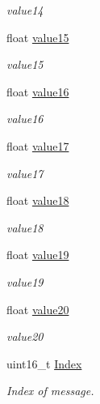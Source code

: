 \begin{DoxyCompactItemize}
\begin{DoxyCompactList}\small\item\em value14 \end{DoxyCompactList}\item 
float \hyperlink{struct____mavlink__aq__telemetry__f__t_add6707aad134b21cad79dd29be356e81}{value15}
\begin{DoxyCompactList}\small\item\em value15 \end{DoxyCompactList}\item 
float \hyperlink{struct____mavlink__aq__telemetry__f__t_a302f85b40e4095e8666e09f5cab8865c}{value16}
\begin{DoxyCompactList}\small\item\em value16 \end{DoxyCompactList}\item 
float \hyperlink{struct____mavlink__aq__telemetry__f__t_ac6b12bfc0d07d3e1c79b8f1b9692ac2d}{value17}
\begin{DoxyCompactList}\small\item\em value17 \end{DoxyCompactList}\item 
float \hyperlink{struct____mavlink__aq__telemetry__f__t_aee06c902caae1cff15844298bb830280}{value18}
\begin{DoxyCompactList}\small\item\em value18 \end{DoxyCompactList}\item 
float \hyperlink{struct____mavlink__aq__telemetry__f__t_a155ab14ba77e328a1b982118c37a1a3e}{value19}
\begin{DoxyCompactList}\small\item\em value19 \end{DoxyCompactList}\item 
float \hyperlink{struct____mavlink__aq__telemetry__f__t_acd544012d0c8d664d035d7a8e97332fd}{value20}
\begin{DoxyCompactList}\small\item\em value20 \end{DoxyCompactList}\item 
uint16\+\_\+t \hyperlink{struct____mavlink__aq__telemetry__f__t_adae5b3626998a82fb9a575e508c834c0}{Index}
\begin{DoxyCompactList}\small\item\em Index of message. \end{DoxyCompactList}\end{DoxyCompactItemize}


